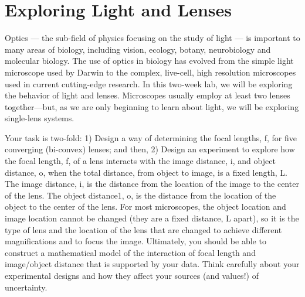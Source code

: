 \chapter{Exploring Light and Lenses}
\thispagestyle{fancy}
%
Optics — the sub-field of physics focusing on the study of light — is important to many areas of biology, including vision, ecology, botany, neurobiology and molecular biology. 
The use of optics in biology has evolved from the simple light microscope used by Darwin to the complex, live-cell, high resolution microscopes used in current cutting-edge research. 
In this two-week lab, we will be exploring the behavior of light and lenses. 
Microscopes usually employ at least two lenses together—but, as we are only beginning to learn about light, we will be exploring single-lens systems. 
\par 
Your task is two-fold: 1) Design a way of determining the focal lengths, f, for five converging (bi-convex) lenses; and then, 2) Design an experiment to explore how the focal length, f, of a lens interacts with the image distance, i, and object distance, o, when the total distance, from object to image, is a fixed length, L. 
The image distance, i, is the distance from the location of the image to the center of the lens. 
The object distance1, o, is the distance from the location of the object to the center of the lens. 
For most microscopes, the object location and image location cannot be changed (they are a fixed distance, L apart), so it is the type of lens and the location of the lens that are changed to achieve different magnifications and to focus the image. 
Ultimately, you should be able to construct a mathematical model of the interaction of focal length and image/object distance that is supported by your data. 
Think carefully about your experimental designs and how they affect your sources (and values!) of uncertainty.
\par
